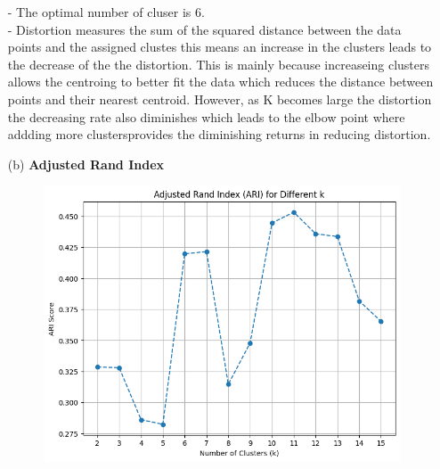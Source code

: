 \documentclass{article}
\begin{document}
\begin{enumerate}
\begin{figure}[H]
\begin{minipage}{0.45\textwidth}
            \label{fig:elbow_graph}
        \end{minipage}
    \end{figure}
    - The optimal number of cluser is 6.\\
    - Distortion measures the sum of the squared distance between the  data points and the assigned clustes this means an increase in the clusters leads to the 
    decrease of the the distortion. This is mainly because increaseing clusters allows the centroing to better fit the data which reduces the distance between points 
    and their nearest centroid. However, as K becomes large the distortion the decreasing rate also diminishes  which leads to the elbow point where addding more clustersprovides the diminishing returns in reducing distortion.

    \item [(b)] \textbf{Adjusted Rand Index}
    \begin{figure}[H]
        \centering
        \begin{minipage}{0.5\textwidth}
            \centering
            \includegraphics[width=\textwidth]{Ari_plot.png}
            \label{fig:ari_plot}
        \end{minipage}
        \hfill
        \begin{minipage}{0.45\textwidth}
            \centering

\end{minipage}
\end{figure}
\end{enumerate}
\end{document}
